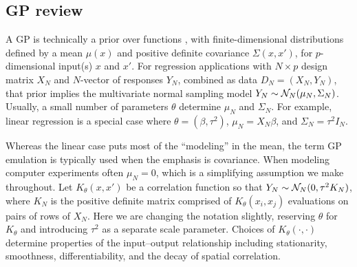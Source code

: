 \documentclass[12pt]{article}
\begin{document}
\subsection{GP review}
\label{sec:gp}

A GP is technically a prior over functions \citep{stein:1999}, with finite-dimensional 
distributions defined by a mean $\mu(x)$ and positive definite
covariance $\Sigma(x, x')$, for $p$-dimensional input(s) $x$ and $x'$. For
regression applications with $N\times p$ design matrix $X_N$ and
$N$-vector of responses $Y_N$, combined as data $D_N = (X_N, Y_N)$, that prior
implies the multivariate normal sampling model $Y_N \sim \mathcal{N}_N(\mu_N,
\Sigma_N)$. Usually,  a small number of parameters $\theta$ determine $\mu_N$
and $\Sigma_N$. For example, linear regression is a special case where $\theta
= (\beta, \tau^2)$, $\mu_N = X_N \beta$, and $\Sigma_N = \tau^2 I_N$.

Whereas the linear case puts most of the ``modeling'' in the mean, the term GP
emulation is typically used when the emphasis is covariance. When modeling
computer experiments \citep[e.g.,][]{sant:will:notz:2003} often $\mu_N = 0$,
which is a simplifying assumption we make throughout.  Let $K_\theta(x, x')$
be a correlation function so that $Y_N \sim \mathcal{N}_N(0, \tau^2 K_N)$, where $K_N$
is the positive definite matrix comprised of $K_\theta(x_i, x_j)$ evaluations
on pairs of rows of $X_N$. Here we are changing the notation slightly,
reserving $\theta$ for $K_\theta$ and introducing $\tau^2$ as a separate scale
parameter. Choices of $K_\theta(\cdot,\cdot)$ determine properties of the
input--output relationship including stationarity, smoothness,
differentiability, and the decay of spatial correlation.
\end{document}
